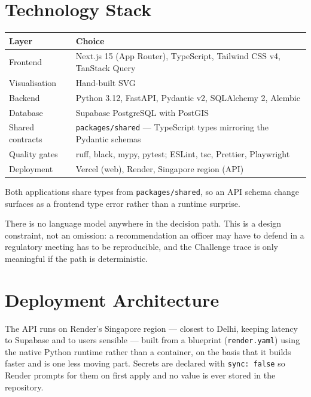 \documentclass[11pt,a4paper]{article}
\newcommand{\code}[1]{\texttt{\small #1}}
\begin{document}
\section{Technology Stack}

\begin{center}
\small
\begin{tabularx}{\linewidth}{@{}l X@{}}
\toprule
\textbf{Layer} & \textbf{Choice} \\
\midrule
Frontend & Next.js 15 (App Router), TypeScript, Tailwind CSS v4, TanStack Query \\
Visualisation & Hand-built SVG \\
Backend & Python 3.12, FastAPI, Pydantic v2, SQLAlchemy 2, Alembic \\
Database & Supabase PostgreSQL with PostGIS \\
Shared contracts & \code{packages/shared} --- TypeScript types mirroring the Pydantic schemas \\
Quality gates & ruff, black, mypy, pytest; ESLint, tsc, Prettier, Playwright \\
Deployment & Vercel (web), Render, Singapore region (API) \\
\bottomrule
\end{tabularx}
\end{center}

Both applications share types from \code{packages/shared}, so an API schema change
surfaces as a frontend type error rather than a runtime surprise.

There is no language model anywhere in the decision path. This is a design
constraint, not an omission: a recommendation an officer may have to defend in a
regulatory meeting has to be reproducible, and the Challenge trace is only
meaningful if the path is deterministic.

\section{Deployment Architecture}

The API runs on Render's Singapore region --- closest to Delhi, keeping latency to
Supabase and to users sensible --- built from a blueprint (\code{render.yaml}) using
the native Python runtime rather than a container, on the basis that it builds
faster and is one less moving part. Secrets are declared with \code{sync: false} so
Render prompts for them on first apply and no value is ever stored in the
repository.
\end{document}
